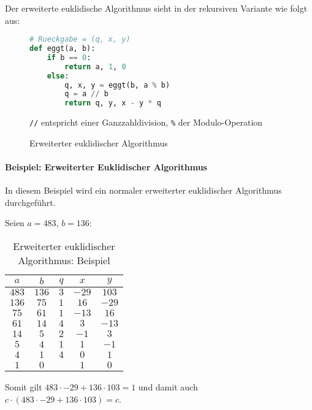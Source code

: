             Der erweiterte euklidische Algorithmus sieht in der rekursiven Variante wie folgt aus:
            \begin{figure}[H]
            	\centering
            	\begin{lstlisting}[language = Python]
# Rueckgabe = (q, x, y)
def eggt(a, b):
	if b == 0:
		return a, 1, 0
	else:
		q, x, y = eggt(b, a % b)
		q = a // b
		return q, y, x - y * q
\end{lstlisting}
				\texttt{//} entspricht einer Ganzzahldivision, \texttt{\%} der Modulo-Operation
            	\caption{Erweiterter euklidischer Algorithmus}
            \end{figure}
        
            \paragraph{Beispiel: Erweiterter Euklidischer Algorithmus}
	            In diesem Beispiel wird ein normaler erweiterter euklidischer Algorithmus durchgeführt.
	            
	            Seien \( a = 483 \), \( b = 136 \):
	            \begin{table}[H]
	            	\centering
	            	\begin{tabular}{|c|c|c|c|c|}
	            		\hline
	            		      \(a\)       &  \(b\)  & \(q\) &        \(x\)        &        \(y\)        \\ \hline
	            		     \(483\)      & \(136\) & \(3\) & \underline{\(-29\)} & \underline{\(103\)} \\ \hline
	            		     \(136\)      & \(75\)  & \(1\) &       \(16\)        &       \(-29\)       \\ \hline
	            		     \(75\)       & \(61\)  & \(1\) &       \(-13\)       &       \(16\)        \\ \hline
	            		     \(61\)       & \(14\)  & \(4\) &        \(3\)        &       \(-13\)       \\ \hline
	            		     \(14\)       &  \(5\)  & \(2\) &       \(-1\)        &        \(3\)        \\ \hline
	            		      \(5\)       &  \(4\)  & \(1\) &        \(1\)        &       \(-1\)        \\ \hline
	            		      \(4\)       &  \(1\)  & \(4\) &        \(0\)        &        \(1\)        \\ \hline
	            		\underline{\(1\)} &  \(0\)  & \(\)  &        \(1\)        &        \(0\)        \\ \hline
	            	\end{tabular}
	            	\caption{Erweiterter euklidischer Algorithmus: Beispiel}
	            \end{table}
	            Somit gilt \( 483 \cdot -29 + 136 \cdot 103 = 1 \) und damit auch \( c \cdot (483 \cdot -29 + 136 \cdot 103) = c \).
            

